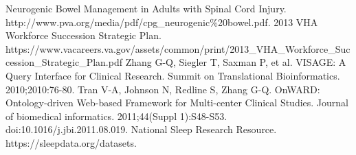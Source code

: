 \documentclass{amia}
\begin{document}
{\begin{thebibliography}{1}
Neurogenic Bowel Management in Adults with Spinal Cord Injury. http://www.pva.org/media/pdf/cpg\_neurogenic\%20bowel.pdf.
2013 VHA Workforce Succession Strategic Plan. https://www.vacareers.va.gov/assets/common/print/2013\_VHA\_Workforce\_Succession\_Strategic\_Plan.pdf
Zhang G-Q, Siegler T, Saxman P, et al. VISAGE: A Query Interface for Clinical Research. Summit on Translational Bioinformatics. 2010;2010:76-80.
Tran V-A, Johnson N, Redline S, Zhang G-Q. OnWARD: Ontology-driven Web-based Framework for Multi-center Clinical Studies. Journal of biomedical informatics. 2011;44(Suppl 1):S48-S53. doi:10.1016/j.jbi.2011.08.019.
National Sleep Research Resource. https://sleepdata.org/datasets.


\end{thebibliography}
}
\end{document}
